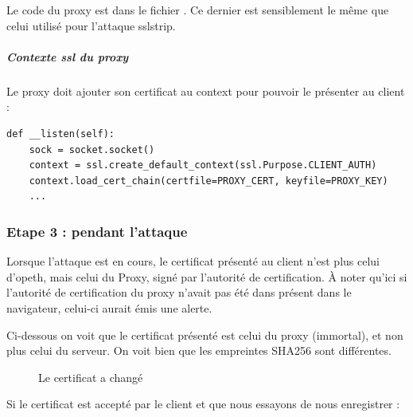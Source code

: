 Le code du proxy est dans le fichier . Ce dernier est sensiblement le même que celui utilisé pour l'attaque sslstrip.

\subparagraph{Contexte ssl du proxy \\}

Le proxy doit ajouter son certificat au context pour pouvoir le présenter au client :

\begin{verbatim}
def __listen(self):
	sock = socket.socket()
	context = ssl.create_default_context(ssl.Purpose.CLIENT_AUTH)
	context.load_cert_chain(certfile=PROXY_CERT, keyfile=PROXY_KEY)
	...
\end{verbatim}

\subsubsection{Etape 3 : pendant l'attaque}

Lorsque l'attaque est en cours, le certificat présenté au client n'est plus celui d'opeth, mais celui du Proxy, signé par l'autorité de certification. À noter qu'ici si l'autorité de certification du proxy n'avait pas été dans présent dans le navigateur, celui-ci aurait émis une alerte.

Ci-dessous on voit que le certificat présenté est celui du proxy (immortal), et non plus celui du serveur. On voit bien que les empreintes SHA256 sont différentes.

\begin{figure}[H]
  \caption{Le certificat a changé}
\end{figure}

Si le certificat est accepté par le client et que nous essayons de nous enregistrer :

